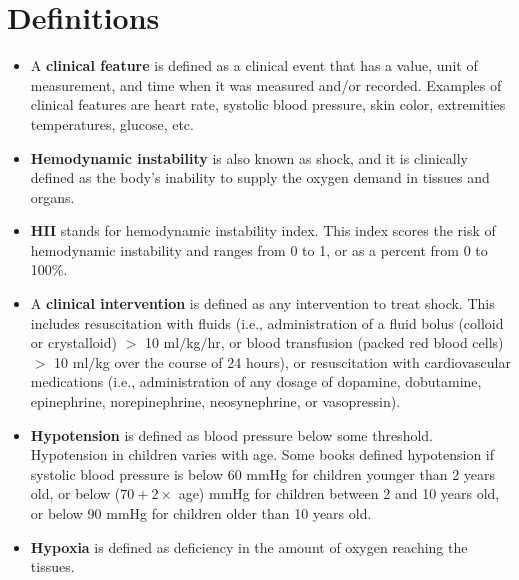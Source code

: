 \documentclass[
   technote
]{phildoc}
\newcommand{\ie}{i.e.,}
\begin{document}
\section{Definitions}
\begin{itemize}
\item[a.] A \textbf{clinical feature} is defined as a clinical event that has a value, unit of measurement, and time when it was measured and/or recorded. Examples of clinical features are heart rate, systolic blood pressure, skin color, extremities temperatures, glucose, etc. 

\item[b.] \textbf{Hemodynamic instability} is also known as shock, and it is clinically defined as the body's inability to supply the oxygen demand in tissues and organs.  
      
\item[c.] \textbf{HII} stands for hemodynamic instability index. This index scores the risk of hemodynamic instability and ranges from 0 to 1, or as a percent from 0 to 100\%. 

\item[d.] A \textbf{clinical intervention} is defined as any intervention to treat shock. This includes resuscitation with fluids (\ie{} administration of a fluid bolus (colloid or crystalloid) $>$ 10 ml$/$kg$/$hr, or blood transfusion (packed red blood cells) $>$ 10 ml$/$kg over the course of 24 hours), or resuscitation with cardiovascular medications (\ie{} administration of any dosage of dopamine, dobutamine, epinephrine, norepinephrine, neosynephrine, or vasopressin).

\item[e.] \textbf{Hypotension} is defined as blood pressure below some threshold. Hypotension in children varies with age. Some books defined hypotension if systolic blood pressure is below 60 mmHg for children younger than 2 years old, or below ($70 + 2\times$ age) mmHg for children between 2 and 10 years old, or below 90 mmHg for children older than 10 years old.

\item[f.] \textbf{Hypoxia} is defined as deficiency in the amount of oxygen reaching the tissues.

\end{itemize}
\end{document}
